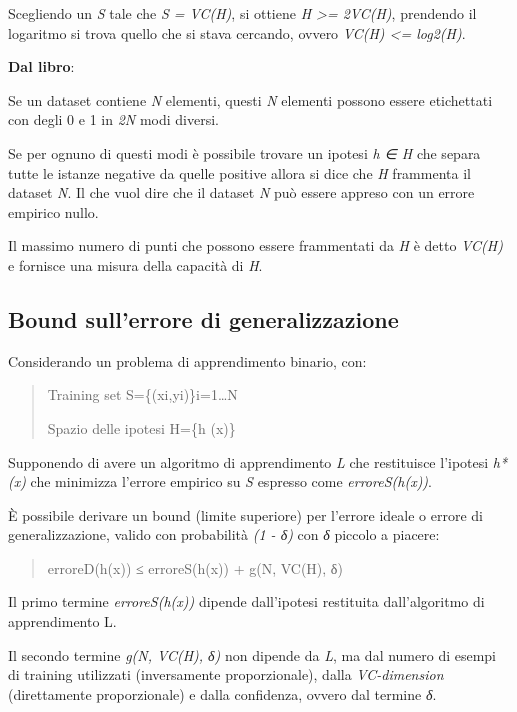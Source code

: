 Scegliendo un \emph{S} tale che \emph{\textbar{}S\textbar{} = VC(H)}, si
ottiene \emph{\textbar{}H\textbar{} \textgreater{}= 2VC(H)}, prendendo
il logaritmo si trova quello che si stava cercando, ovvero \emph{VC(H)
\textless{}= log2(\textbar{}H\textbar{})}.

\textbf{Dal libro}:

Se un dataset contiene \emph{N} elementi, questi \emph{N} elementi
possono essere etichettati con degli 0 e 1 in \emph{2N} modi diversi.

Se per ognuno di questi modi è possibile trovare un ipotesi \emph{h ∈ H}
che separa tutte le istanze negative da quelle positive allora si dice
che \emph{H} frammenta il dataset \emph{N}. Il che vuol dire che il
dataset \emph{N} può essere appreso con un errore empirico nullo.

Il massimo numero di punti che possono essere frammentati da \emph{H} è
detto \emph{VC(H)} e fornisce una misura della capacità di \emph{H}.

\subsection{Bound sull'errore di
generalizzazione}\label{bound-sullerrore-di-generalizzazione}

Considerando un problema di apprendimento binario, con:

\begin{quote}
Training set S=\{(xi,yi)\}i=1\ldots{}N

Spazio delle ipotesi H=\{h (x)\}
\end{quote}

Supponendo di avere un algoritmo di apprendimento \emph{L} che
restituisce l'ipotesi \emph{h*(x)} che minimizza l'errore empirico su
\emph{S} espresso come \emph{erroreS(h(x))}.

È possibile derivare un bound (limite superiore) per l'errore ideale o
errore di generalizzazione, valido con probabilità \emph{(1 - δ)} con
\emph{δ} piccolo a piacere:

\begin{quote}
erroreD(h(x)) ≤ erroreS(h(x)) + g(N, VC(H), δ)
\end{quote}

Il primo termine \emph{erroreS(h(x))} dipende dall'ipotesi restituita
dall'algoritmo di apprendimento L.

Il secondo termine \emph{g(N, VC(H), δ)} non dipende da \emph{L}, ma dal
numero di esempi di training utilizzati (inversamente proporzionale),
dalla \emph{VC-dimension} (direttamente proporzionale) e dalla
confidenza, ovvero dal termine \emph{δ}.

